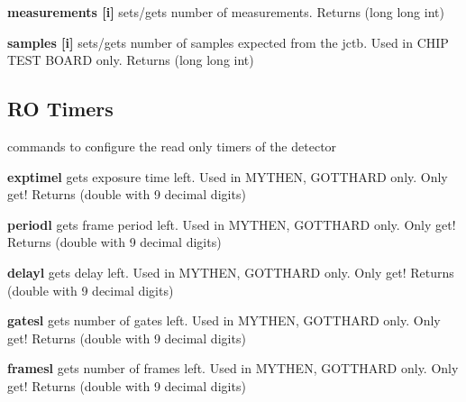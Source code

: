 \begin{DoxyItemize}
\item {\bfseries measurements \mbox{[}i\mbox{]}} sets/gets number of measurements. {\ttfamily Returns} {\ttfamily }(long long int)
\end{DoxyItemize}


\begin{DoxyItemize}
\item {\bfseries samples \mbox{[}i\mbox{]}} sets/gets number of samples expected from the jctb. Used in CHIP TEST BOARD only. {\ttfamily Returns} {\ttfamily }(long long int)
\end{DoxyItemize}\hypertarget{config_configrotimers}{}\subsection{RO Timers}\label{config_configrotimers}
commands to configure the read only timers of the detector


\begin{DoxyItemize}
\item {\bfseries exptimel} gets exposure time left. Used in MYTHEN, GOTTHARD only. Only get! {\ttfamily Returns} {\ttfamily }(double with 9 decimal digits)
\end{DoxyItemize}


\begin{DoxyItemize}
\item {\bfseries periodl} gets frame period left. Used in MYTHEN, GOTTHARD only. Only get! {\ttfamily Returns} {\ttfamily }(double with 9 decimal digits)
\end{DoxyItemize}


\begin{DoxyItemize}
\item {\bfseries delayl} gets delay left. Used in MYTHEN, GOTTHARD only. Only get! {\ttfamily Returns} {\ttfamily }(double with 9 decimal digits)
\end{DoxyItemize}


\begin{DoxyItemize}
\item {\bfseries gatesl} gets number of gates left. Used in MYTHEN, GOTTHARD only. Only get! {\ttfamily Returns} {\ttfamily }(double with 9 decimal digits)
\end{DoxyItemize}


\begin{DoxyItemize}
\item {\bfseries framesl} gets number of frames left. Used in MYTHEN, GOTTHARD only. Only get! {\ttfamily Returns} {\ttfamily }(double with 9 decimal digits)
\end{DoxyItemize}


